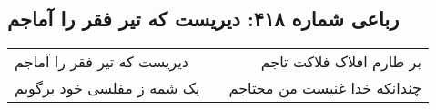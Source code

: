 \begin{center}
\section*{رباعی شماره ۴۱۸: دیریست که تیر فقر را آماجم}
\label{sec:sh418}
\begin{longtable}{l p{0.5cm} r}
دیریست که تیر فقر را آماجم
&&
بر طارم افلاک فلاکت تاجم
\\
یک شمه ز مفلسی خود برگویم
&&
چندانکه خدا غنیست من محتاجم
\\
\end{longtable}
\end{center}
